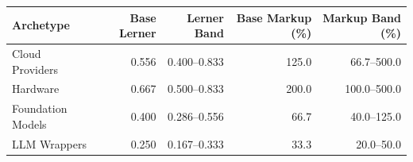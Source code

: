 

\begin{tabular}{@{}lrrrr@{}}
\toprule
Archetype & Base Lerner & Lerner Band & Base Markup (\%) & Markup Band (\%) \\
\midrule
Cloud Providers & 0.556 & 0.400–0.833 & 125.0 & 66.7–500.0 \\
Hardware & 0.667 & 0.500–0.833 & 200.0 & 100.0–500.0 \\
Foundation Models & 0.400 & 0.286–0.556 & 66.7 & 40.0–125.0 \\
LLM Wrappers & 0.250 & 0.167–0.333 & 33.3 & 20.0–50.0 \\
\bottomrule
\end{tabular}